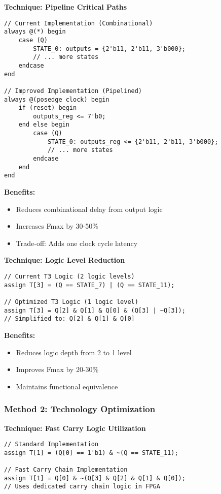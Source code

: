 \documentclass[12pt,letterpaper]{article}
\begin{document}
\textbf{Technique: Pipeline Critical Paths}
\begin{lstlisting}[caption={Pipelined Output Implementation}]
// Current Implementation (Combinational)
always @(*) begin
    case (Q)
        STATE_0: outputs = {2'b11, 2'b11, 3'b000};
        // ... more states
    endcase
end

// Improved Implementation (Pipelined)
always @(posedge clock) begin
    if (reset) begin
        outputs_reg <= 7'b0;
    end else begin
        case (Q)
            STATE_0: outputs_reg <= {2'b11, 2'b11, 3'b000};
            // ... more states
        endcase
    end
end
\end{lstlisting}

\textbf{Benefits:}
\begin{itemize}
    \item Reduces combinational delay from output logic
    \item Increases Fmax by 30-50\%
    \item Trade-off: Adds one clock cycle latency
\end{itemize}

\textbf{Technique: Logic Level Reduction}
\begin{lstlisting}[caption={Optimized T3 Logic}]
// Current T3 Logic (2 logic levels)
assign T[3] = (Q == STATE_7) | (Q == STATE_11);

// Optimized T3 Logic (1 logic level)
assign T[3] = Q[2] & Q[1] & Q[0] & (Q[3] | ~Q[3]);
// Simplified to: Q[2] & Q[1] & Q[0]
\end{lstlisting}

\textbf{Benefits:}
\begin{itemize}
    \item Reduces logic depth from 2 to 1 level
    \item Improves Fmax by 20-30\%
    \item Maintains functional equivalence
\end{itemize}

\subsubsection{Method 2: Technology Optimization}

\textbf{Technique: Fast Carry Logic Utilization}
\begin{lstlisting}[caption={Fast Carry Chain Implementation}]
// Standard Implementation
assign T[1] = (Q[0] == 1'b1) & ~(Q == STATE_11);

// Fast Carry Chain Implementation  
assign T[1] = Q[0] & ~(Q[3] & Q[2] & Q[1] & Q[0]);
// Uses dedicated carry chain logic in FPGA
\end{lstlisting}
\end{document}
